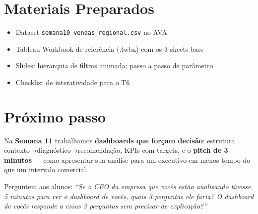 \section{Materiais Preparados}
\begin{itemize}
  \item Dataset \texttt{semana10\_vendas\_regional.csv} no AVA
  \item Tableau Workbook de referência (.twbx) com os 3 sheets base
  \item Slides: hierarquia de filtros animada; passo a passo de parâmetro
  \item Checklist de interatividade para o T6
\end{itemize}

\section{Próximo passo}

Na \textbf{Semana 11} trabalhamos \textbf{dashboards que forçam decisão}:
estrutura contexto→diagnóstico→recomendação, KPIs com targets, e o
\textbf{pitch de 3 minutos} — como apresentar sua análise para um executivo
em menos tempo do que um intervalo comercial.

Perguntem aos alunos: \textit{``Se o CEO da empresa que vocês estão analisando
tivesse 5 minutos para ver o dashboard de vocês, quais 3 perguntas ele faria?
O dashboard de vocês responde a essas 3 perguntas sem precisar de explicação?''}
